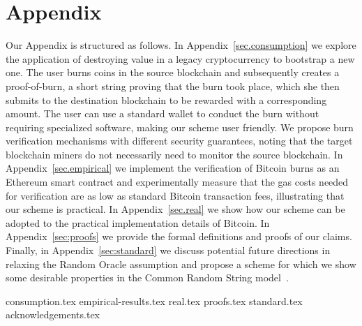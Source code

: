 \section*{Appendix}

Our Appendix is structured as follows.
In Appendix~\ref{sec.consumption} we explore the application of destroying value in a legacy cryptocurrency to bootstrap a new one. The user burns coins in the source blockchain and subsequently creates a proof-of-burn, a short string proving that the burn took place, which she then submits to the destination blockchain to be rewarded with a corresponding amount. The user can use a standard wallet to conduct the burn without requiring specialized software, making our scheme user friendly. We propose burn verification mechanisms with different security guarantees, noting that the target blockchain miners do not necessarily need to monitor the source blockchain. 
In Appendix~\ref{sec.empirical}
we implement the verification of Bitcoin burns
as an Ethereum smart contract and experimentally measure that the gas costs needed for
verification are as low as standard Bitcoin transaction fees, illustrating
that our scheme is practical. In Appendix~\ref{sec.real} we show how
our scheme can be adopted to the practical implementation details of Bitcoin.
In Appendix~\ref{sec:proofs} we provide the formal definitions and proofs of our
claims. Finally, in Appendix~\ref{sec:standard}
we discuss potential future directions in relaxing the Random Oracle assumption
and propose a scheme for which we show some desirable properties in
the Common Random String model~\cite{STOC:BluFelMic88}.

{consumption.tex}
{empirical-results.tex}
{real.tex}
{proofs.tex}
{standard.tex}
{acknowledgements.tex}

